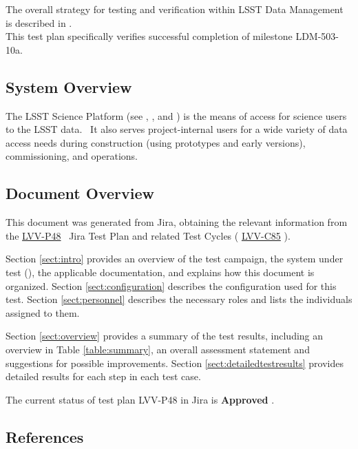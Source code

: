 \documentclass[DM,lsstdraft,STR,toc]{lsstdoc}
\begin{document}
The overall strategy for testing and verification within LSST Data
Management is described in .\\
This test plan specifically verifies successful completion of milestone
LDM-503-10a.



\subsection{System Overview}
\label{sect:systemoverview}

The LSST Science Platform (see , , and ) is the
means of access for science users to the LSST data. ~It also serves
project-internal users for a wide variety of data access needs during
construction (using prototypes and early versions), commissioning, and
operations.


\subsection{Document Overview}
\label{sect:docoverview}

This document was generated from Jira, obtaining the relevant information from the 
\href{https://jira.lsstcorp.org/secure/Tests.jspa#/testPlan/LVV-P48}{LVV-P48}
~Jira Test Plan and related Test Cycles (
  \href{https://jira.lsstcorp.org/secure/Tests.jspa#/testCycle/LVV-C85}{LVV-C85}
).

Section \ref{sect:intro} provides an overview of the test campaign, the system under test (\product{}), the applicable documentation, and explains how this document is organized.
Section \ref{sect:configuration}  describes the configuration used for this test.
Section \ref{sect:personnel} describes the necessary roles and lists the individuals assigned to them.

Section \ref{sect:overview} provides a summary of the test results, including an overview in Table \ref{table:summary}, an overall assessment statement and suggestions for possible improvements.
Section \ref{sect:detailedtestresults} provides detailed results for each step in each test case.

The current status of test plan LVV-P48 in Jira is \textbf{ Approved }.

\subsection{References}
\label{sect:references}
\renewcommand{\refname}{}

\end{document}
